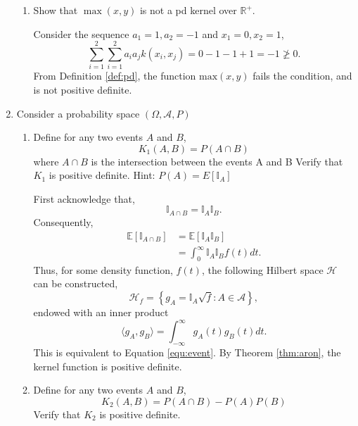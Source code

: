 \documentclass{article}[12pt]
\begin{document}
\begin{enumerate}
\begin{enumerate}
\item Show that $\max(x,y)$ is not a pd kernel over  $\mathbb{R}^+$. 


Consider the sequence $a_1=1, a_2=-1$ and $x_1=0, x_2=1$,
\begin{equation}
\sum_{i=1}^{2} \sum_{i=1}^{2} a_i a_j k(x_i, x_j) = 0 -1 -1 + 1 = -1 \not \ge 0.
\end{equation}
From Definition \ref{def:pd}, the function $\text{max}(x,y)$ fails the condition, and is not positive definite.
\end{enumerate}
\item Consider a probability space $(\Omega,\mathcal{A},P)$
\begin{enumerate}
\item Define for any two events $A$ and $B$, 
$$K_1(A,B)=P(A \cap B)$$
where $A \cap B$ is the intersection between the events A and B 
Verify that $K_1$ is positive definite. Hint: $P(A)=E[\mathbb{I}_A]$

First acknowledge that,
\begin{equation}
\mathbb I _{A \cap B} = \mathbb{I}_A \mathbb{I}_B.
\end{equation}
Consequently, 
\begin{equation}\label{equ:event}
\begin{aligned} 
\mathbb E \left[ \mathbb I_{A \cap B} \right] &= \mathbb E \left[ \mathbb I_{A} \mathbb I_{B} \right]\\
&= \int_0^\infty \mathbb I_{A} \mathbb I_{B} f(t)
 dt. \end{aligned}
\end{equation}
Thus, for some density function, $f(t)$, the following Hilbert space $\mathcal H$ can be constructed,
\begin{equation}
\mathcal H_f = \left\{g_A = \mathbb I_A \sqrt{f} : A \in \mathcal A \right\},
\end{equation}
endowed with an inner product
\begin{equation}
\langle g_A, g_B\rangle = \int_{-\infty}^{\infty} g_A(t) g_B (t) dt.
\end{equation}
This is equivalent to Equation \ref{equ:event}. By Theorem \ref{thm:aron}, the kernel function is positive definite.


\item Define for any two events $A$ and $B$, 
$$K_2(A,B)=P(A \cap B)-P(A)P(B)$$
Verify that $K_2$ is positive definite. 


\end{enumerate}
\end{enumerate}
\end{document}
